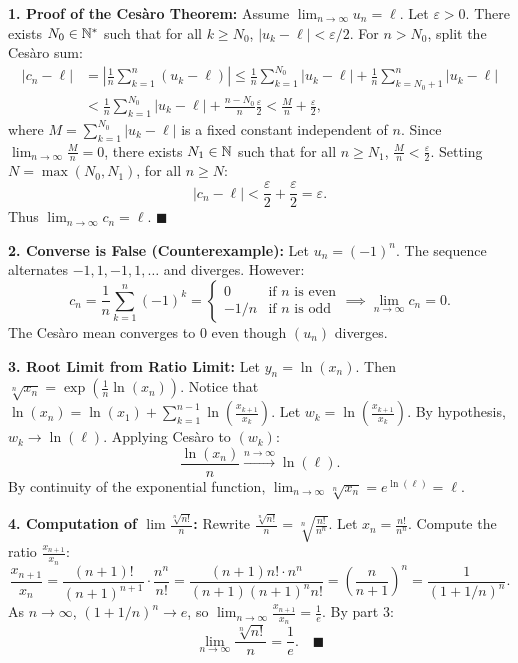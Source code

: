 \begin{solution}
\textbf{1. Proof of the Cesàro Theorem:}
Assume $\lim_{n \to \infty} u_n = \ell$. Let $\varepsilon > 0$.
There exists $N_0 \in \mathbb{N}^*$ such that for all $k \ge N_0$, $|u_k - \ell| < \varepsilon/2$.
For $n > N_0$, split the Cesàro sum:
\begin{align*}
|c_n - \ell| &= \left| \frac{1}{n}\sum_{k=1}^n (u_k - \ell) \right| \le \frac{1}{n}\sum_{k=1}^{N_0} |u_k - \ell| + \frac{1}{n}\sum_{k=N_0+1}^n |u_k - \ell| \\
&< \frac{1}{n}\sum_{k=1}^{N_0} |u_k - \ell| + \frac{n - N_0}{n}\frac{\varepsilon}{2} < \frac{M}{n} + \frac{\varepsilon}{2},
\end{align*}
where $M = \sum_{k=1}^{N_0} |u_k - \ell|$ is a fixed constant independent of $n$.
Since $\lim_{n \to \infty} \frac{M}{n} = 0$, there exists $N_1 \in \mathbb{N}$ such that for all $n \ge N_1$, $\frac{M}{n} < \frac{\varepsilon}{2}$.
Setting $N = \max(N_0, N_1)$, for all $n \ge N$:
\[
|c_n - \ell| < \frac{\varepsilon}{2} + \frac{\varepsilon}{2} = \varepsilon.
\]
Thus $\lim_{n \to \infty} c_n = \ell$. \hfill $\blacksquare$

\textbf{2. Converse is False (Counterexample):}
Let $u_n = (-1)^n$. The sequence alternates $-1, 1, -1, 1, \dots$ and diverges.
However:
\[
c_n = \frac{1}{n}\sum_{k=1}^n (-1)^k = \begin{cases} 0 & \text{if } n \text{ is even} \\ -1/n & \text{if } n \text{ is odd} \end{cases} \implies \lim_{n \to \infty} c_n = 0.
\]
The Cesàro mean converges to 0 even though $(u_n)$ diverges.

\textbf{3. Root Limit from Ratio Limit:}
Let $y_n = \ln(x_n)$. Then $\sqrt[n]{x_n} = \exp\left(\frac{1}{n}\ln(x_n)\right)$.
Notice that $\ln(x_n) = \ln(x_1) + \sum_{k=1}^{n-1} \ln\left(\frac{x_{k+1}}{x_k}\right)$.
Let $w_k = \ln\left(\frac{x_{k+1}}{x_k}\right)$. By hypothesis, $w_k \to \ln(\ell)$.
Applying Cesàro to $(w_k)$:
\[
\frac{\ln(x_n)}{n} \xrightarrow{n \to \infty} \ln(\ell).
\]
By continuity of the exponential function, $\lim_{n \to \infty} \sqrt[n]{x_n} = e^{\ln(\ell)} = \ell$.

\textbf{4. Computation of $\lim \frac{\sqrt[n]{n!}}{n}$:}
Rewrite $\frac{\sqrt[n]{n!}}{n} = \sqrt[n]{\frac{n!}{n^n}}$.
Let $x_n = \frac{n!}{n^n}$. Compute the ratio $\frac{x_{n+1}}{x_n}$:
\[
\frac{x_{n+1}}{x_n} = \frac{(n+1)!}{(n+1)^{n+1}} \cdot \frac{n^n}{n!} = \frac{(n+1) n! \cdot n^n}{(n+1)(n+1)^n n!} = \left(\frac{n}{n+1}\right)^n = \frac{1}{(1 + 1/n)^n}.
\]
As $n \to \infty$, $(1 + 1/n)^n \to e$, so $\lim_{n \to \infty} \frac{x_{n+1}}{x_n} = \frac{1}{e}$.
By part 3:
\[
\lim_{n \to \infty} \frac{\sqrt[n]{n!}}{n} = \frac{1}{e}. \quad \blacksquare
\]
\end{solution}

